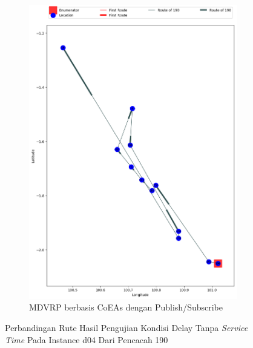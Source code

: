 \begin{figure}[H]\ContinuedFloat
	\centering
	\begin{subfigure}[t]{\textwidth}
		\centering
		\includegraphics[width=\textwidth]{Resources/Images/delayed_4/real_m15_n100_delayed_4_190_pubsub_coes}
		\caption{MDVRP berbasis CoEAs dengan Publish/Subscribe}
		\label{fig:real_m15_n100_delayed_4_190_pubsub_coes}
	\end{subfigure}
	\caption{Perbandingan Rute Hasil Pengujian Kondisi Delay Tanpa \textit{Service Time} Pada Instance d04 Dari Pencacah 190}
	\label{fig:real_m15_n100_delayed_4_190_contd}
\end{figure}


